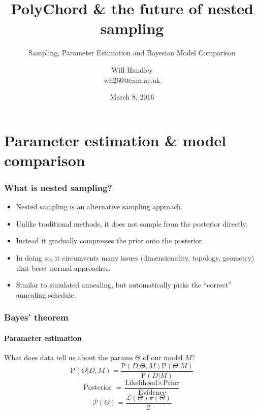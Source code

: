 \documentclass[]{beamer}
\title{PolyChord \& the future of nested sampling}
\subtitle{Sampling, Parameter Estimation and Bayesian Model Comparison}
\author[Handley] %
{Will Handley\\ \small{wh260@cam.ac.uk}}
\institute[University of Cambridge] %
{%
Supervisors: Anthony Lasenby \& Mike Hobson \\
Astrophysics Group \\
Cavendish Laboratory \\
University of Cambridge
}
\date{March 8, 2016}
\newcommand{\lik}{\mathcal{L}}
\newcommand{\posterior}{\mathcal{P}}
\newcommand{\prior}{\pi}
\newcommand{\ev}{\mathcal{Z}}
\newcommand{\prob}{\mathrm{P}}
\begin{document}
\begin{frame}
  \titlepage
\end{frame}

\begin{frame}
  \tableofcontents
\end{frame}


\section{Parameter estimation \& model comparison}
%
%
%

\begin{frame}
  \frametitle{What is nested sampling?}
  \begin{itemize}
    \item<2-> Nested sampling is an alternative sampling approach. 
    \item<3-> Unlike traditional methods, it does not sample from the posterior directly.
    \item<4-> Instead it gradually compresses the prior onto the posterior.
    \item<5-> In doing so, it circumvents many issues (dimensionality, topology, geometry) that beset normal approaches.
    \item<5-> Similar to simulated annealing, but automatically picks the ``correct'' annealing schedule.
  \end{itemize}
\end{frame}

\begin{frame}
  \frametitle{Bayes' theorem}
  \framesubtitle{Parameter estimation}

  \pause
  What does data tell us about the params $\Theta$ of our model $M$?
    \[\prob(\Theta|D,M) = \frac{\prob(D|\Theta,M) \prob(\Theta|M) }{ \prob(D|M) }\] 
    \pause
    \[\text{Posterior } = \frac{\text{Likelihood} \times \text{Prior} } {\text{Evidence} }\] 
    \pause
    \[ \posterior(\Theta)= \frac{\lik(\Theta) \prior(\Theta)} {\ev}\] 

\end{frame}
\end{document}

